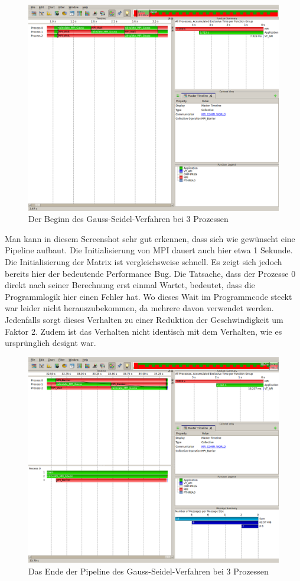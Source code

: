 \documentclass[a4paper,12pt]{scrartcl}
\begin{document}
\begin{figure}[hr!]
 \includegraphics[scale=0.45]{./3_2_GS/Start.png}
 \caption{Der Beginn des Gauss-Seidel-Verfahren bei 3 Prozessen}
\end{figure}
Man kann in diesem Screenshot sehr gut erkennen, dass sich wie gewünscht eine Pipeline aufbaut. Die Initialisierung von MPI dauert auch hier etwa 1 Sekunde. Die Initialisierung der Matrix ist vergleichsweise schnell. Es zeigt sich jedoch bereits hier der bedeutende Performance Bug. Die Tatsache, dass der Prozesse 0 direkt nach seiner Berechnung erst einmal Wartet, bedeutet, dass die Programmlogik hier einen Fehler hat. Wo dieses Wait im Programmcode steckt war leider nicht herauszubekommen, da mehrere davon verwendet werden. Jedenfalls sorgt dieses Verhalten zu einer Reduktion der Geschwindigkeit um Faktor 2. Zudem ist das Verhalten nicht identisch mit dem Verhalten, wie es ursprünglich designt war. 
\FloatBarrier
\begin{figure}[hr!]
 \includegraphics[scale=0.45]{./3_2_GS/End.png}
 \caption{Das Ende der Pipeline des Gauss-Seidel-Verfahren bei 3 Prozessen}
\end{figure}
\end{document}

